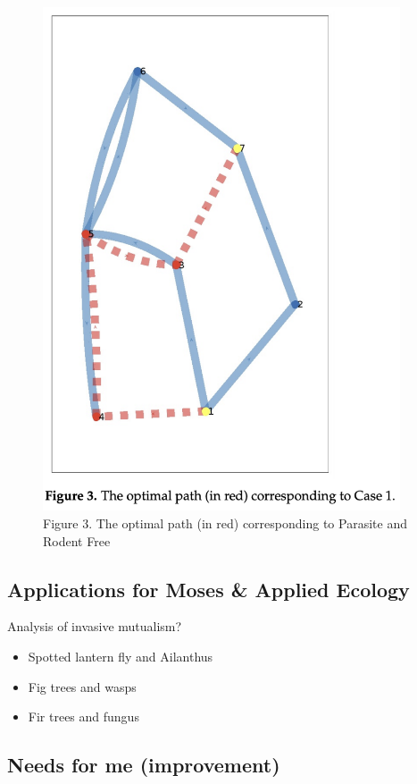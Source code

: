 \documentclass[
  letterpaper,
  DIV=11,
  numbers=noendperiod]{scrartcl}
\begin{document}
\begin{figure}[H]

{\centering \includegraphics[width=4.16667in,height=\textheight]{images/fox_path.png}

}

\caption{Figure 3. The optimal path (in red) corresponding to Parasite
and Rodent Free}

\end{figure}%

\subsection{Applications for Moses \& Applied
Ecology}\label{applications-for-moses-applied-ecology}

Analysis of invasive mutualism?

\begin{itemize}
\item
  Spotted lantern fly and Ailanthus
\item
  Fig trees and wasps
\item
  Fir trees and fungus
\end{itemize}

\subsection{Needs for me (improvement)}\label{needs-for-me-improvement}
\end{document}
